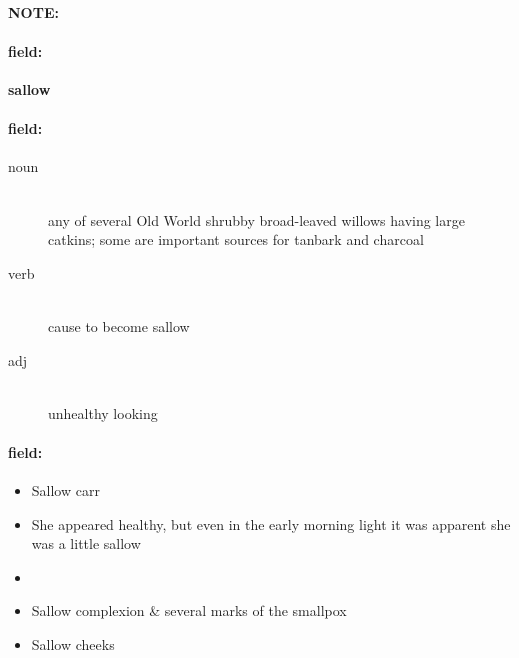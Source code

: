 \documentclass[12pt]{article}
\newenvironment{note}{\paragraph{NOTE:}}{}
\newenvironment{field}{\paragraph{field:}}{}
\begin{document}
\begin{note}
\begin{field}
\textbf{\large sallow}
\end{field}


\begin{field}
\begin{description}
\item[noun] \hfill \\ 
any of several Old World shrubby broad-leaved willows having large catkins; some are important sources for tanbark and charcoal

\item[verb] \hfill \\ 
cause to become sallow

\item[adj] \hfill \\ 
unhealthy looking

\end{description}
\end{field}

\begin{field}
\begin{itemize}
\item Sallow carr
\item She appeared healthy, but even in the early morning light it was apparent she was a little sallow
\item 
\item Sallow complexion & several marks of the smallpox
\item Sallow cheeks
\end{itemize}
\end{field}
\end{note}
\end{document}
